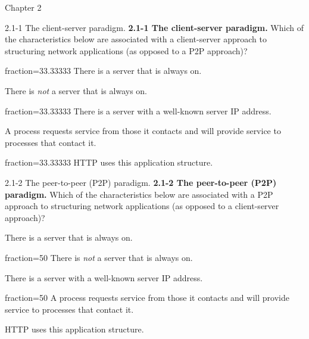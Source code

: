 \documentclass[a4paper]{article}
\begin{document}
\begin{quiz}{Chapter 2}

\begin{multi}[points=1,shuffle,multiple,]{2.1-1 The client-server paradigm.}
\textbf{2.1-1 The client-server paradigm.} Which of the characteristics below are associated with a client-server approach to structuring network applications (as opposed to a P2P approach)?
\item[fraction=33.33333] There is a server that is always on.
\item There is \emph{not} a server that is always on.
\item[fraction=33.33333] There is a server with a well-known server IP address.
\item A process requests service from those it contacts and will provide service to processes that contact it.
\item[fraction=33.33333] HTTP uses this application structure.
\end{multi}

\begin{multi}[points=1,shuffle,multiple]{2.1-2 The peer-to-peer (P2P) paradigm.}
\textbf{2.1-2 The peer-to-peer (P2P) paradigm.} Which of the characteristics below are associated with a P2P approach to structuring network applications (as opposed to a client-server approach)?
\item There is a server that is always on.
\item[fraction=50] There is \emph{not} a server that is always on.
\item There is a server with a well-known server IP address.
\item[fraction=50] A process requests service from those it contacts and will provide service to processes that contact it.
\item HTTP uses this application structure.
\end{multi}


\end{quiz}
\end{document}
